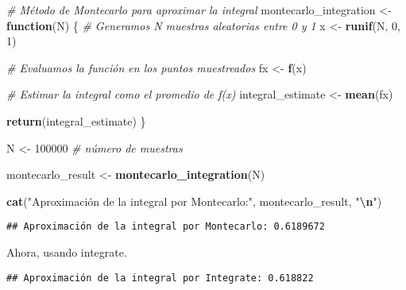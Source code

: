 \documentclass[
]{article}
\newenvironment{Shaded}{\begin{snugshade}}{\end{snugshade}}
\newcommand{\CommentTok}[1]{\textcolor[rgb]{0.56,0.35,0.01}{\textit{#1}}}
\newcommand{\ControlFlowTok}[1]{\textcolor[rgb]{0.13,0.29,0.53}{\textbf{#1}}}
\newcommand{\DecValTok}[1]{\textcolor[rgb]{0.00,0.00,0.81}{#1}}
\newcommand{\FunctionTok}[1]{\textcolor[rgb]{0.13,0.29,0.53}{\textbf{#1}}}
\newcommand{\NormalTok}[1]{#1}
\newcommand{\OtherTok}[1]{\textcolor[rgb]{0.56,0.35,0.01}{#1}}
\newcommand{\SpecialCharTok}[1]{\textcolor[rgb]{0.81,0.36,0.00}{\textbf{#1}}}
\newcommand{\StringTok}[1]{\textcolor[rgb]{0.31,0.60,0.02}{#1}}
\begin{document}
\begin{Shaded}
\begin{Highlighting}[]
\CommentTok{\# Método de Montecarlo para aproximar la integral}
\NormalTok{montecarlo\_integration }\OtherTok{\textless{}{-}} \ControlFlowTok{function}\NormalTok{(N) \{}
  \CommentTok{\# Generamos N muestras aleatorias entre 0 y 1}
\NormalTok{  x }\OtherTok{\textless{}{-}} \FunctionTok{runif}\NormalTok{(N, }\DecValTok{0}\NormalTok{, }\DecValTok{1}\NormalTok{)}
  
  \CommentTok{\# Evaluamos la función en los puntos muestreados}
\NormalTok{  fx }\OtherTok{\textless{}{-}} \FunctionTok{f}\NormalTok{(x)}
  
  \CommentTok{\# Estimar la integral como el promedio de f(x)}
\NormalTok{  integral\_estimate }\OtherTok{\textless{}{-}} \FunctionTok{mean}\NormalTok{(fx)}

  \FunctionTok{return}\NormalTok{(integral\_estimate)}
\NormalTok{\}}

\NormalTok{N }\OtherTok{\textless{}{-}} \DecValTok{100000}  \CommentTok{\# número de muestras}

\NormalTok{montecarlo\_result }\OtherTok{\textless{}{-}} \FunctionTok{montecarlo\_integration}\NormalTok{(N)}

\FunctionTok{cat}\NormalTok{(}\StringTok{"Aproximación de la integral por Montecarlo:"}\NormalTok{, montecarlo\_result, }\StringTok{"}\SpecialCharTok{\textbackslash{}n}\StringTok{"}\NormalTok{)}
\end{Highlighting}
\end{Shaded}

\begin{verbatim}
## Aproximación de la integral por Montecarlo: 0.6189672
\end{verbatim}

Ahora, usando integrate.

\begin{Shaded}
\end{Shaded}

\begin{verbatim}
## Aproximación de la integral por Integrate: 0.618822
\end{verbatim}
\end{document}
